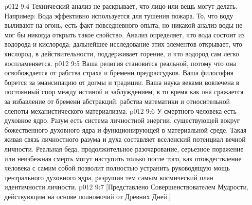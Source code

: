 \vs p012 9:4 Технический анализ не раскрывает, что лицо или вещь могут делать. Например: Вода эффективно используется для тушения пожара. То, что воду выливают на огонь, есть факт повседневного опыта, но никакой анализ воды не мог бы никогда открыть такое свойство. Анализ определяет, что вода состоит из водорода и кислорода; дальнейшее исследование этих элементов открывает, что кислород, в действительности, поддерживает горение, и что водород сам легко воспламеняется.
\vs p012 9:5 Ваша религия становится реальной, потому что она освобождается от рабства страха и бремени предрассудков. Ваша философия борется за эмансипацию от догмы и традиции. Ваша наука веками вовлечена в постоянный спор между истиной и заблуждением, в то время как она сражается за избавление от бремени абстракций, рабства математики и относительной слепоты механистического материализма.
\vs p012 9:6 \pc У смертного человека есть духовное ядро. Разум есть система личностной энергии, существующей вокруг божественного духовного ядра и функционирующей в материальной среде. Такая живая связь личностного разума и духа составляет вселенский потенциал вечной личности. Реальная беда, продолжительное разочарование, серьезное поражение или неизбежная смерть могут наступить только после того, как отождествление человека с самим собой позволит полностью устранить руководящую мощь центрального духовного ядра, разрушив тем самым космический план идентичности личности.
\vsetoff
\vs p012 9:7 [Представлено Совершенствователем Мудрости, действующим на основе полномочий от Древних Дней.]

